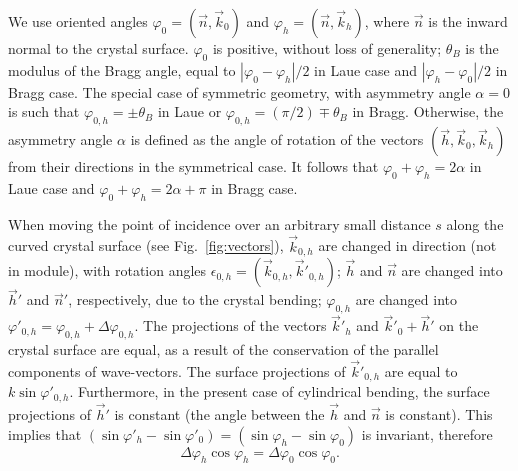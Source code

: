 \documentclass[preprint]{iucr}              %
\begin{document}
We use oriented angles $\varphi_0 = (\vec n, \vec k_0)$ and $\varphi_h = (\vec n, \vec k_h)$, where $\vec n$ is the inward normal to the crystal surface. $\varphi_0$ is positive, without loss of generality; $\theta_B$ is the modulus of the Bragg angle, equal to $|\varphi_0-\varphi_h|/2$ in Laue case and  $|\varphi_h-\varphi_0|/2$ in Bragg case. The special case of symmetric geometry, with asymmetry angle $\alpha=0$ is such that $\varphi_{0,h}=\pm\theta_B$ in Laue or $\varphi_{0,h}=(\pi/2)\mp\theta_B$ in Bragg. Otherwise, the asymmetry angle $\alpha$ is defined as the angle of rotation of the vectors $(\vec h, \vec k_0, \vec k_h)$ from their directions in the symmetrical case. 
It follows that $\varphi_0+\varphi_h=2\alpha$ in Laue case and  $\varphi_0+\varphi_h=2\alpha+\pi$ in Bragg case.

When moving the point of incidence over an arbitrary small distance $s$ along the curved crystal surface (see Fig.~\ref{fig:vectors}), 
$\vec k_{0,h}$ are changed in direction (not in module), with rotation angles $\epsilon_{0,h} = (\vec k_{0,h},\vec k'_{0,h})$; $\vec h$ and $\vec n$ are changed into $\vec h'$ and $\vec n'$, respectively, due to the crystal bending;
$\varphi_{0,h}$ are changed into $\varphi'_{0,h}=\varphi_{0,h}+\Delta \varphi_{0,h}$.
The projections of the vectors $\vec k'_{h}$ and $\vec k'_{0}+\vec h'$ on the crystal surface are equal, as a result of the conservation of the parallel components of wave-vectors. The surface projections of $\vec k'_{0,h}$ 
are equal to $k \sin\varphi'_{0,h}$. Furthermore, in the present case of cylindrical bending, the surface projections of $\vec h'$ is constant (the angle between the $\vec h$ and $\vec n$ is constant).
This implies that $(\sin \varphi'_h - \sin \varphi'_0) = (\sin \varphi_h - \sin \varphi_0)$ is invariant, therefore
\begin{equation}
\label{eq:invariant}
    \Delta \varphi_h \cos\varphi_h = \Delta \varphi_0 \cos\varphi_0.
\end{equation}
\end{document}
